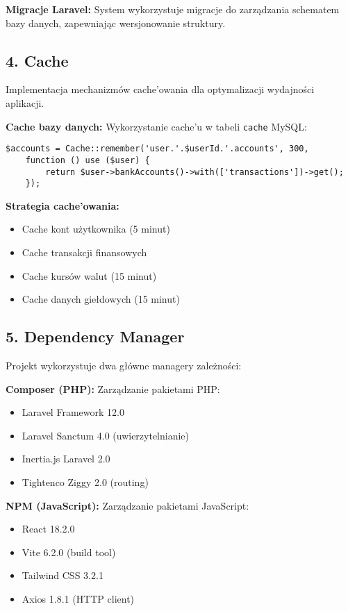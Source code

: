 \textbf{Migracje Laravel:} System wykorzystuje migracje do zarządzania schematem bazy danych, zapewniając wersjonowanie struktury.

\subsection{4. Cache}

Implementacja mechanizmów cache'owania dla optymalizacji wydajności aplikacji.

\textbf{Cache bazy danych:} Wykorzystanie cache'u w tabeli \texttt{cache} MySQL:
\begin{verbatim}
$accounts = Cache::remember('user.'.$userId.'.accounts', 300,
    function () use ($user) {
        return $user->bankAccounts()->with(['transactions'])->get();
    });
\end{verbatim}

\textbf{Strategia cache'owania:}
\begin{itemize}
    \item Cache kont użytkownika (5 minut)
    \item Cache transakcji finansowych
    \item Cache kursów walut (15 minut)
    \item Cache danych giełdowych (15 minut)
\end{itemize}

\subsection{5. Dependency Manager}

Projekt wykorzystuje dwa główne managery zależności:

\textbf{Composer (PHP):} Zarządzanie pakietami PHP:
\begin{itemize}
    \item Laravel Framework 12.0
    \item Laravel Sanctum 4.0 (uwierzytelnianie)
    \item Inertia.js Laravel 2.0
    \item Tightenco Ziggy 2.0 (routing)
\end{itemize}

\textbf{NPM (JavaScript):} Zarządzanie pakietami JavaScript:
\begin{itemize}
    \item React 18.2.0
    \item Vite 6.2.0 (build tool)
    \item Tailwind CSS 3.2.1
    \item Axios 1.8.1 (HTTP client)
\end{itemize}

